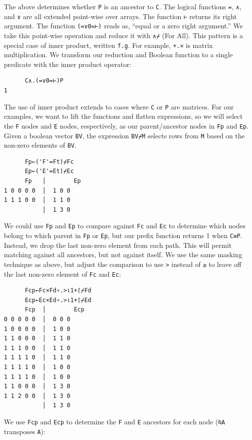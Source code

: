 ﻿\documentclass[numbers,10pt,preprint]{sigplanconf}
\begin{document}
\noindent The above determines whether \verb;P; is an ancestor to \verb;C;. The logical functions \verb;=;, \verb;∧;, and \verb;∨; are all extended point-wise over arrays. The function \verb;⊢; returns its right argument. The function \verb;(=∨0=⊢); reads as, ``equal or a zero right argument.'' We take this point-wise operation and reduce it with \verb;∧⌿; (For All). This pattern is a special case of inner product, written \verb;f.g;. For example, \verb;+.×; is matrix multiplication. We transform our reduction and Boolean function to a single predicate with the inner product operator:

\begin{verbatim}
      C∧.(=∨0=⊢)P
1
\end{verbatim}

The use of inner product extends to cases where \verb;C; or \verb;P; are matrices. For our examples, we want to lift the functions and flatten expressions, so we will select the \verb;F; nodes and \verb;E; nodes, respectively, as our parent/ancestor nodes in \verb;Fp; and \verb;Ep;. Given a boolean vector \verb;BV;, the expression \verb;BV⌿M; selects rows from \verb;M; based on the non-zero elements of \verb;BV;.

\begin{verbatim}
      Fp←('F'=Ft)⌿Fc
      Ep←('E'=Et)⌿Ec
      Fp   │        Ep
1 0 0 0 0  │  1 0 0
1 1 1 0 0  │  1 1 0
           │  1 3 0
\end{verbatim}

\noindent We could use \verb;Fp; and \verb;Ep; to compare against \verb;Fc; and \verb;Ec; to determine which nodes belong to which parent in \verb;Fp; or \verb;Ep;, but our prefix function returns 1 when \verb;C≡P;. Instead, we drop the last non-zero element from each path. This will permit matching against all ancestors, but not against itself. We use the same masking technique as above, but adjust the comparison to use \verb;>; instead of \verb;≥; to leave off the last non-zero element of \verb;Fc; and \verb;Ec;:

\begin{verbatim}
      Fcp←Fc×Fd∘.>⍳1+⌈⌿Fd
      Ecp←Ec×Ed∘.>⍳1+⌈⌿Ed
      Fcp  │        Ecp
0 0 0 0 0  │  0 0 0
1 0 0 0 0  │  1 0 0
1 1 0 0 0  │  1 1 0
1 1 1 0 0  │  1 1 0
1 1 1 1 0  │  1 1 0
1 1 1 1 0  │  1 0 0
1 1 1 1 0  │  1 0 0
1 1 0 0 0  │  1 3 0
1 1 2 0 0  │  1 3 0
           │  1 3 0
\end{verbatim}

\noindent We use \verb;Fcp; and \verb;Ecp; to determine the \verb;F; and \verb;E; ancestors for each node (\verb;⍉A; transposes \verb;A;):
\end{document}
